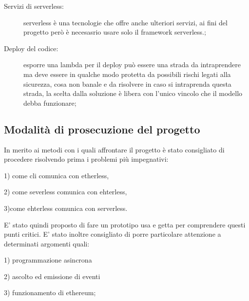 \begin{description}
	\item[Servizi di serverless:] serverless è una tecnologie che offre anche ulteriori servizi, ai fini del progetto però è necesasrio usare solo il framework serverless.;
	\item[Deploy del codice:] esporre una lambda per il deploy può essere una strada da intraprendere ma deve essere in qualche modo protetta da possibili rischi legati alla sicurezza, cosa non banale e da risolvere in caso si intraprenda questa strada, la scelta dalla soluzione è libera con l'unico vincolo che il modello debba funzionare;
\end{description}

\subsection{Modalità di prosecuzione del progetto}
In merito ai metodi con i quali affrontare il progetto è stato consigliato di procedere risolvendo prima i problemi più impegnativi:
	\begin{description}
	\item 1) come cli comunica con etherless, 
	\item 2) come severless comunica con ehterless, 
	\item 3)come ehterless comunica con serverless. 
	\end{description}	
	E' stato quindi proposto di fare un prototipo usa e getta per comprendere questi punti critici.
	E' stato inoltre consigliato di porre particolare attenzione a determinati argomenti quali:
	\begin{description}
	\item 1) programmazione asincrona
	\item 2) ascolto ed emissione di eventi
	\item 3) funzionamento di ethereum;
	\end{description}
